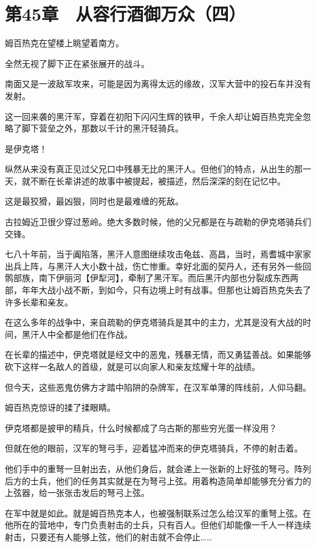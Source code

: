 \section{第45章　从容行酒御万众（四）}

姆百热克在望楼上眺望着南方。

全然无视了脚下正在紧张展开的战斗。

南面又是一波敌军攻来，可能是因为离得太远的缘故，汉军大营中的投石车并没有发射。

这一回来袭的黑汗军，穿着在初阳下闪闪生辉的铁甲，千余人却让姆百热克完全忽略了脚下营垒之外，那数以千计的黑汗轻骑兵。

是伊克塔！

纵然从来没有真正见过父兄口中残暴无比的黑汗人。但他们的特点，从出生的那一天，就不断在长辈讲述的故事中被提起，被描述，然后深深的刻在记忆中。

这是最狡猾，最凶狠，同时也是最难缠的死敌。

古拉姆近卫很少穿过葱岭。绝大多数时候，他的父兄都是在与疏勒的伊克塔骑兵们交锋。

七八十年前，当于阗陷落，黑汗人意图继续攻击龟兹、高昌，当时，焉耆城中家家出兵上阵，与黑汗人大小数十战，伤亡惨重。幸好北面的契丹人，还有另外一些回鹘部族，南下伊丽河【伊犁河】，牵制了黑汗军。而后黑汗内部也分裂成东西两部，年年大战小战不断，到如今，只有边境上时有战事。但那也让姆百热克失去了许多长辈和亲友。

在这么多年的战争中，来自疏勒的伊克塔骑兵是其中的主力，尤其是没有大战的时间，黑汗人中全都是他们在作战。

在长辈的描述中，伊克塔就是经文中的恶鬼，残暴无情，而又勇猛善战。如果能够砍下这样一名敌人的首级，就是可以向家人和亲友炫耀十年的战绩。

但今天，这些恶鬼仿佛方才踏中陷阱的杂牌军，在汉军单薄的阵线前，人仰马翻。

姆百热克惊讶的揉了揉眼睛。

伊克塔都是披甲的精兵，什么时候都成了乌古斯的那些穷光蛋一样没用？

但就在他的眼前，汉军的弩弓手，迎着猛冲而来的伊克塔骑兵，不停的射击着。

他们手中的重弩一旦射出去，从他们身后，就会递上一张新的上好弦的弩弓。阵列后方的士兵，他们的任务其实就是在为弩弓上弦。用着构造简单却能够充分省力的上弦器，给一张张击发后的弩弓上弦。

在军中就是如此。就是姆百热克本人，也被强制联系过怎么给汉军的重弩上弦。在他所在的营地中，专门负责射击的士兵，只有百人。但他们却能像一千人一样连续射击，只要还有人能够上弦，他们的射击就不会停止……

